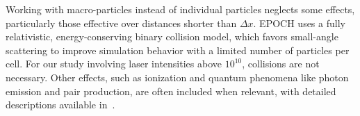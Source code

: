 Working with macro-particles instead of individual particles neglects some effects, particularly those effective over distances shorter than $\Delta x$. EPOCH uses a fully relativistic, energy-conserving binary collision model, which favors small-angle scattering to improve simulation behavior with a limited number of particles per cell. For our study involving laser intensities above $10^{10}$, collisions are not necessary. Other effects, such as ionization and quantum phenomena like photon emission and pair production, are often included when relevant, with detailed descriptions available in~\cite{arber2015}.